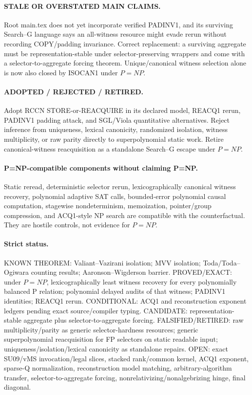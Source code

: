 \documentclass[11pt]{article}
\begin{document}
\paragraph{STALE OR OVERSTATED MAIN CLAIMS.} Root main.tex does not yet incorporate verified PADINV1, and its surviving Search--G language says an all-witness resource might evade rerun without recording COPY/padding invariance. Correct replacement: a surviving aggregate must be representation-stable under selector-preserving wrappers and come with a selector-to-aggregate forcing theorem. Unique/canonical witness selection alone is now also closed by ISOCAN1 under $P=NP$.

\paragraph{ADOPTED / REJECTED / RETIRED.} Adopt RCCN STORE-or-REACQUIRE in its declared model, REACQ1 rerun, PADINV1 padding attack, and SGL/Viola quantitative alternatives. Reject inference from uniqueness, lexical canonicity, randomized isolation, witness multiplicity, or raw parity directly to superpolynomial static work. Retire canonical-witness reacquisition as a standalone Search--G escape under $P=NP$.

\paragraph{P=NP-compatible components without claiming P=NP.} Static reread, deterministic selector rerun, lexicographically canonical witness recovery, polynomial adaptive SAT calls, bounded-error polynomial causal computation, stagewise nondeterminism, memoization, pointer/group compression, and ACQ1-style NP search are compatible with the counterfactual. They are hostile controls, not evidence for $P=NP$.

\paragraph{Strict status.} KNOWN THEOREM: Valiant--Vazirani isolation; MVV isolation; Toda/Toda--Ogiwara counting results; Aaronson--Wigderson barrier. PROVED/EXACT: under $P=NP$, lexicographically least witness recovery for every polynomially balanced P relation; polynomial delayed audits of that witness; PADINV1 identities; REACQ1 rerun. CONDITIONAL: ACQ1 and reconstruction exponent ledgers pending exact source/compiler typing. CANDIDATE: representation-stable aggregate plus selector-to-aggregate forcing. FALSIFIED/RETIRED: raw multiplicity/parity as generic selector-hardness resources; generic superpolynomial reacquisition for FP selectors on static readable input; uniqueness/isolation/lexical canonicity as standalone repairs. OPEN: exact SU09/vMS invocation/legal slices, stacked rank/common kernel, ACQ1 exponent, sparse-Q normalization, reconstruction model matching, arbitrary-algorithm transfer, selector-to-aggregate forcing, nonrelativizing/nonalgebrizing hinge, final diagonal.
\end{document}

